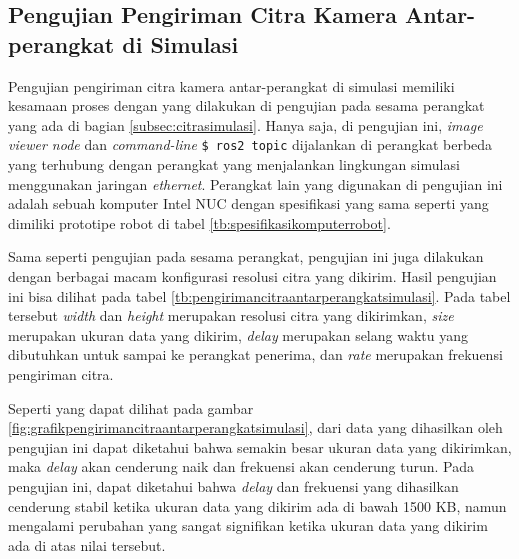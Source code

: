 \subsection{Pengujian Pengiriman Citra Kamera Antar-perangkat di Simulasi}
\label{subsec:citraantarperangkatsimulasi}

Pengujian pengiriman citra kamera antar-perangkat di simulasi memiliki kesamaan proses dengan yang dilakukan di pengujian pada sesama perangkat yang ada di bagian \ref{subsec:citrasimulasi}.
Hanya saja, di pengujian ini, \emph{image viewer node} dan \emph{command-line} \lstinline{$ ros2 topic} dijalankan di perangkat berbeda yang terhubung dengan perangkat yang menjalankan lingkungan simulasi menggunakan jaringan \emph{ethernet}.
Perangkat lain yang digunakan di pengujian ini adalah sebuah komputer Intel NUC dengan spesifikasi yang sama seperti yang dimiliki prototipe robot di tabel \ref{tb:spesifikasikomputerrobot}.

Sama seperti pengujian pada sesama perangkat,
  pengujian ini juga dilakukan dengan berbagai macam konfigurasi resolusi citra yang dikirim.
Hasil pengujian ini bisa dilihat pada tabel \ref{tb:pengirimancitraantarperangkatsimulasi}.
Pada tabel tersebut \emph{width} dan \emph{height} merupakan resolusi citra yang dikirimkan,
  \emph{size} merupakan ukuran data yang dikirim,
  \emph{delay} merupakan selang waktu yang dibutuhkan untuk sampai ke perangkat penerima,
  dan \emph{rate} merupakan frekuensi pengiriman citra.

Seperti yang dapat dilihat pada gambar \ref{fig:grafikpengirimancitraantarperangkatsimulasi},
  dari data yang dihasilkan oleh pengujian ini dapat diketahui bahwa semakin besar ukuran data yang dikirimkan,
  maka \emph{delay} akan cenderung naik dan frekuensi akan cenderung turun.
Pada pengujian ini, dapat diketahui bahwa \emph{delay} dan frekuensi yang dihasilkan cenderung stabil ketika ukuran data yang dikirim ada di bawah 1500 KB,
  namun mengalami perubahan yang sangat signifikan ketika ukuran data yang dikirim ada di atas nilai tersebut.




